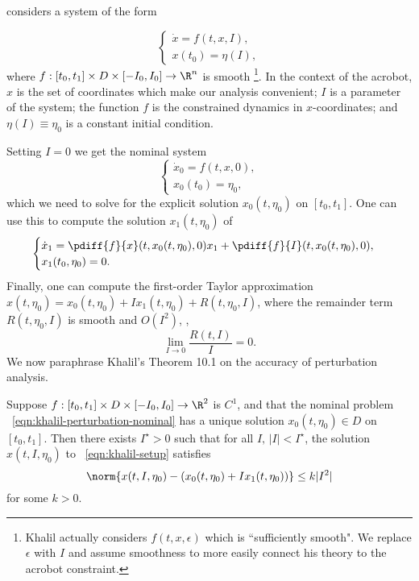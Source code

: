\citet{khalil_nonlinear} considers a system of the form

\begin{equation}\label{eqn:khalil-setup}
    \begin{cases}
        \dot{x} = f(t,x,I), \\
        x(t_0) = \eta(I),
    \end{cases}
\end{equation}
where 
\(f : [t_0,t_1] \times D \times [-I_0,I_0] \rightarrow \R^n\) is smooth
\footnote{Khalil actually considers \(f(t,x,\epsilon)\) which is ``sufficiently
    smooth". We replace \(\epsilon\) with \(I\) and assume smoothness to
    more easily connect his theory to the acrobot constraint.}.
In the context of the acrobot, \(x\) is the set of coordinates which make
our analysis convenient;
\(I\) is a parameter of the system;
the function \(f\) is the constrained dynamics in \(x\)-coordinates;
and \(\eta(I) \equiv \eta_0\) is a constant initial condition.

Setting \(I = 0\) we get the nominal system
\begin{equation}\label{eqn:khalil-perturbation-nominal}
    \begin{cases}
        \dot{x}_0 = f(t,x,0) ,\\
        x_0(t_0) = \eta_0 ,
    \end{cases}
\end{equation}
which we need to solve for the explicit solution \(x_0(t,\eta_0)\) on \([t_0,t_1]\).
One can use this to compute the solution \(x_1(t,\eta_0)\) of
\begin{equation}\label{eqn:khalil-perturbation-firstorder}
    \begin{cases}
        \dot{x}_1 = \pdiff{f}{x}(t,x_0(t,\eta_0),0)x_1 + \pdiff{f}{I}(t,x_0(t,\eta_0),0)
        , \\
        x_1(t_0,\eta_0) = 0
        .
    \end{cases}
\end{equation}
Finally, one can compute the first-order Taylor approximation
\(x(t,\eta_0) = x_0(t,\eta_0) + I x_1(t,\eta_0) + R(t,\eta_0,I)\), where the remainder
term \(R(t,\eta_0,I)\) is smooth and \(O(I^2)\), \ie,
\[
    \lim \limits_{I \to 0} \frac{R(t,I)}{I} = 0
    .
\]
We now paraphrase Khalil's Theorem 10.1 \cite{khalil_nonlinear} on the
accuracy of perturbation analysis.
\begin{thm}\label{thm:khalil-perturbation}
    Suppose \(f : [t_0,t_1] \times D \times [-I_0,I_0] \rightarrow \R^2\) is
    \(C^1\), and that the nominal problem ~\eqref{eqn:khalil-perturbation-nominal} has a
    unique solution \(x_0(t,\eta_0) \in D\) on \([t_0,t_1]\).
    Then there exists \(I^\star > 0\) such that for all \(I,\, |I| < I^\star\), the
    solution \(x(t,I,\eta_0)\) to ~\eqref{eqn:khalil-setup} satisfies
    \[
        \norm{x(t,I,\eta_0) - \left(x_0(t,\eta_0) + I x_1(t,\eta_0)\right)} \leq k |I^2|
    \]
    for some \(k > 0\).
\end{thm}

